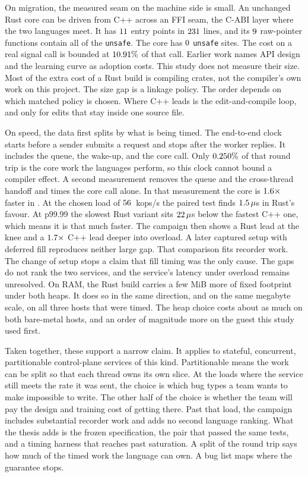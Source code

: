\documentclass[english,oneside,a4paper,censored,csm,software-track-2020]{HYthesisML}
\begin{document}
On migration, the measured seam on the machine side is small.
An unchanged Rust core can be driven from C++ across an FFI seam, the C-ABI layer where the two languages meet.
It has $11$ entry points in $231$ lines, and its $9$ raw-pointer functions contain all of the \texttt{unsafe}.
The core has $0$ \texttt{unsafe} sites.
The cost on a real signal call is bounded at $10.91\%$ of that call.
Earlier work names API design and the learning curve as adoption costs. This study does not measure their size.
Most of the extra cost of a Rust build is compiling crates, not the compiler's own work on this project.
The size gap is a linkage policy. The order depends on which matched policy is chosen.
Where C++ leads is the edit-and-compile loop, and only for edits that stay inside one source file.

On speed, the data first splits by what is being timed.
The end-to-end clock starts before a sender submits a request and stops after the worker replies.
It includes the queue, the wake-up, and the core call.
Only $0.250\%$ of that round trip is the core work the languages perform, so this clock cannot bound a compiler effect.
A second measurement removes the queue and the cross-thread handoff and times the core call alone.
In that measurement the core is $1.6\times$ faster in \BudgetCoreFaster{}.
At the chosen load of $56$~kops/s the paired test finds $1.5\,\mu$s in Rust's favour.
At p99.99 the slowest Rust variant sits $22\,\mu$s below the fastest C++ one, which means it is that much faster.
The campaign then shows a Rust lead at the knee and a $1.7\times$ C++ lead deeper into overload.
A later captured setup with deferred fill reproduces neither large gap.
That comparison fits recorder work. The change of setup stops a claim that fill timing was the only cause.
The gaps do not rank the two services, and the service's latency under overload remains unresolved.
On RAM, the Rust build carries a few MiB more of fixed footprint under both heaps.
It does so in the same direction, and on the same megabyte scale, on all three hosts that were timed.
The heap choice costs about as much on both bare-metal hosts, and an order of magnitude more on the guest this study used first.

Taken together, these support a narrow claim.
It applies to stateful, concurrent, partitionable control-plane services of this kind.
Partitionable means the work can be split so that each thread owns its own slice.
At the loads where the service still meets the rate it was sent, the choice is which bug types a team wants to make impossible to write.
The other half of the choice is whether the team will pay the design and training cost of getting there.
Past that load, the campaign includes substantial recorder work and adds no second language ranking.
What the thesis adds is the frozen specification, the pair that passed the same tests, and a timing harness that reaches past saturation.
A split of the round trip says how much of the timed work the language can own.
A bug list maps where the guarantee stops.
\end{document}
